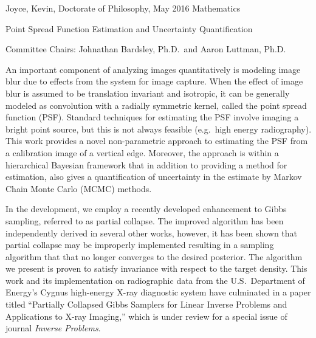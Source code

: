 %
%
\setcounter{page}{2}                    %
%
%

Joyce, Kevin, Doctorate of Philosophy, May 2016 \hfill Mathematics
   
Point Spread Function Estimation and Uncertainty Quantification

%
Committee Chairs: Johnathan Bardsley, Ph.D.~and Aaron Luttman, Ph.D.    %
%
\setlength{\parindent}{2ex}
%
%


\indent 
An important component of analyzing images quantitatively is modeling image blur due to effects from the system for image capture. 
When the effect of image blur is assumed to be translation invariant and isotropic, it can be generally modeled as convolution with a radially symmetric kernel, called the point spread function (PSF).
Standard techniques for estimating the PSF involve imaging a bright point source, but this is not always feasible (e.g.~high energy radiography).  
This work provides a novel non-parametric approach to estimating the PSF from a calibration image of a vertical edge.
Moreover, the approach is within a hierarchical Bayesian framework that in addition to providing a method for estimation, also gives a quantification of uncertainty in the estimate by Markov Chain Monte Carlo (MCMC) methods.

\indent
In the development, we employ a recently developed enhancement to Gibbs sampling, referred to as partial collapse. 
The improved algorithm has been independently derived in several other works, however, it has been shown that partial collapse may be improperly implemented resulting in a sampling algorithm that that no longer converges to the desired posterior.
The algorithm we present is proven to satisfy invariance with respect to the target density.
This work and its implementation on radiographic data from the U.S.~Department of Energy's Cygnus high-energy X-ray diagnostic system have culminated in a paper titled ``Partially Collapsed Gibbs Samplers for Linear Inverse Problems and Applications to X-ray Imaging,'' which is under review for a special issue of journal \emph{Inverse Problems}.


